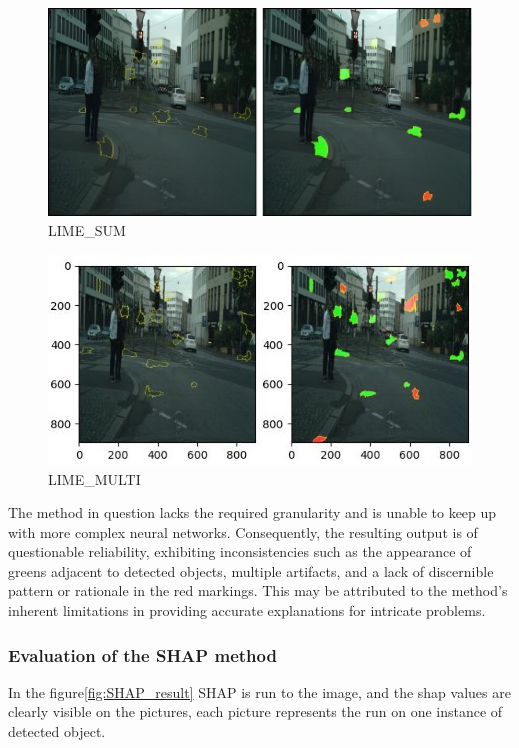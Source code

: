 \begin{figure}[h]
    \centering
    \includegraphics[width=\textwidth]{figures/best-box_bonn_000035_000019_leftImg8bit}
    \caption{LIME\_SUM}
    \label{fig:LIME1}
\end{figure}
\hfill
\begin{figure}[h]
    \centering
    \includegraphics[width=\textwidth]{figures/best-box_bonn_000035_000019_leftImg8bit_MULTI}
    \caption{LIME\_MULTI}
    \label{fig:LIME2}
\end{figure}

The method in question lacks the required granularity and is unable to keep up with more complex neural networks.
Consequently, the resulting output is of questionable reliability, exhibiting inconsistencies such as the appearance of greens adjacent to detected objects, multiple artifacts, and a lack of discernible pattern or rationale in the red markings.
This may be attributed to the method's inherent limitations in providing accurate explanations for intricate problems.

\subsubsection{Evaluation of the SHAP method}\label{subsubsec:evaluation-of-the-shap-method}
In the figure\ref{fig:SHAP_result} SHAP is run to the image, and the shap values are clearly visible on the pictures, each picture represents the run on one instance of detected object.

